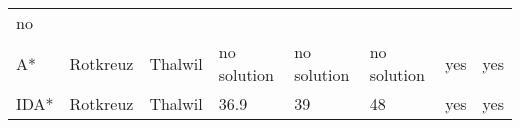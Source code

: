 \documentclass[11pt]{article}
\begin{document}
\begin{longtable}[]{@{}llllllll@{}}
\begin{minipage}[t]{0.09\columnwidth}
no\strut
\end{minipage}\tabularnewline
\begin{minipage}[t]{0.11\columnwidth}\raggedright
A*\strut
\end{minipage} & \begin{minipage}[t]{0.11\columnwidth}\raggedright
Rotkreuz\strut
\end{minipage} & \begin{minipage}[t]{0.09\columnwidth}\raggedright
Thalwil\strut
\end{minipage} & \begin{minipage}[t]{0.09\columnwidth}\raggedright
no solution\strut
\end{minipage} & \begin{minipage}[t]{0.09\columnwidth}\raggedright
no solution\strut
\end{minipage} & \begin{minipage}[t]{0.09\columnwidth}\raggedright
no solution\strut
\end{minipage} & \begin{minipage}[t]{0.09\columnwidth}\raggedright
yes\strut
\end{minipage} & \begin{minipage}[t]{0.09\columnwidth}\raggedright
yes\strut
\end{minipage}\tabularnewline
\begin{minipage}[t]{0.11\columnwidth}\raggedright
IDA*\strut
\end{minipage} & \begin{minipage}[t]{0.11\columnwidth}\raggedright
Rotkreuz\strut
\end{minipage} & \begin{minipage}[t]{0.09\columnwidth}\raggedright
Thalwil\strut
\end{minipage} & \begin{minipage}[t]{0.09\columnwidth}\raggedright
36.9\strut
\end{minipage} & \begin{minipage}[t]{0.09\columnwidth}\raggedright
39\strut
\end{minipage} & \begin{minipage}[t]{0.09\columnwidth}\raggedright
48\strut
\end{minipage} & \begin{minipage}[t]{0.09\columnwidth}\raggedright
yes\strut
\end{minipage} & \begin{minipage}[t]{0.09\columnwidth}\raggedright
yes\strut
\end{minipage}\tabularnewline
\bottomrule
\end{longtable}


    
    
    
    
\end{document}
